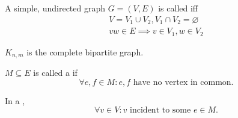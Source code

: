\begin{definition}
A simple, undirected graph $G=(V,E)$ is called 
iff
\begin{align*}
    V = V_1\cup V_2, V_1\cap V_2 = \varnothing \\
    vw\in E\implies v\in V_1, w\in V_2
\end{align*}
\end{definition}

$K_{n,m}$ is the complete bipartite graph.

\begin{definition}
$M\subseteq E$ is called a  if
\[
    \forall e,f\in M: e,f\text{ have no vertex in common.}
\]
\end{definition}
\begin{definition}
In a ,
\[
    \forall v\in V: v\text{ incident to some }e\in M.
\]
\end{definition}



